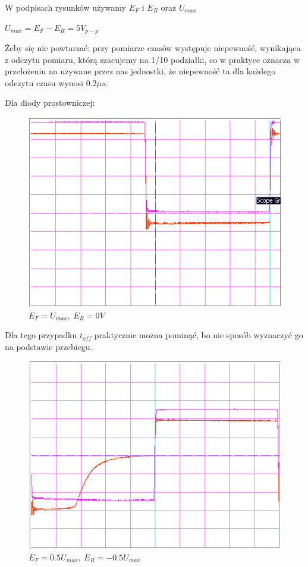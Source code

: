 \documentclass[a4paper,11pt]{article}
\begin{document}
W podpisach rysunków używamy \(E_F \) i \(E_R \) oraz \(U_{max} \)

\(U_{max} = E_F - E_R = 5V_{p-p}\)


Żeby się nie powtarzać: przy pomiarze czasów występuje niepewność, wynikająca z odczytu pomiaru, którą szacujemy na 1/10 podziałki, co w praktyce oznacza w przełożeniu na używane przez nas jednostki, że niepewność ta dla każdego odczytu czasu wynosi \(0.2 \mu s\).

Dla diody prostowniczej:

\begin{figure} [H]
  \begin{center}
    \includegraphics{../Obrazki_i_tekst/obrobione/1asciety.png}
    \caption{\( E_F = U_{max}, \ E_R = 0V \)}
  \end{center}
\end{figure}

Dla tego przypadku \( t_{off} \) praktycznie można pominąć, bo nie sposób wyznaczyć go na podstawie przebiegu.

\begin{figure} [H]
  \begin{center}
    \includegraphics{../Obrazki_i_tekst/obrobione/1bsciety.png}
    \caption{\( E_F = 0.5 U_{max}, \ E_R = -0.5 U_{max}\)}
  \end{center}
\end{figure}
\end{document}
